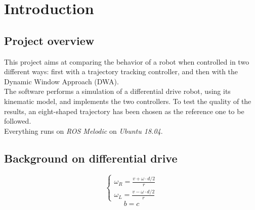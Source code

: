 \documentclass[11pt,a4paper]{article}
\begin{document}


\newpage

\renewcommand*\contentsname{Table of Contents}
\tableofcontents

\newpage





\section{Introduction}


\subsection{Project overview}

This project aims at comparing the behavior of a robot when controlled in two different ways: first with a
trajectory tracking controller, and then with the Dynamic Window Approach (DWA).\\

The software performs a simulation of a differential drive robot, using its kinematic model, and implements
the two controllers. To test the quality of the results, an eight-shaped trajectory has been chosen as the
reference one to be followed.\\

Everything runs on \textit{ROS Melodic} on \textit{Ubuntu 18.04}.


\subsection{Background on differential drive}


\begin{multicols}{2}
    $$
    \begin{cases}
        \omega_R = {\frac {v + \omega \cdot d/2}{r}} \\
        \omega_L = {\frac {v - \omega \cdot d/2}{r}}
    \end{cases}
    $$
    \break
    \begin{equation}
        b=c
    \end{equation}
\end{multicols}
\end{document}
